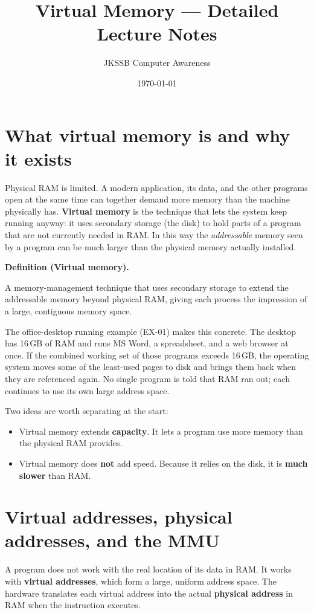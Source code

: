 \documentclass[11pt]{article}
\title{Virtual Memory --- Detailed Lecture Notes}
\author{JKSSB Computer Awareness}
\date{\today}
\newenvironment{definitionbox}[1]{%
  \par\noindent\textbf{Definition (#1).}\ \itshape
}{\par\vspace{0.3em}}
\begin{document}
\maketitle

\section{What virtual memory is and why it exists}
Physical RAM is limited. A modern application, its data, and the other
programs open at the same time can together demand more memory than the
machine physically has. \textbf{Virtual memory} is the technique that lets the
system keep running anyway: it uses secondary storage (the disk) to hold parts
of a program that are not currently needed in RAM. In this way the \emph{addressable}
memory seen by a program can be much larger than the physical memory actually
installed.

\begin{definitionbox}{Virtual memory}
A memory-management technique that uses secondary storage to extend the
addressable memory beyond physical RAM, giving each process the impression of a
large, contiguous memory space.
\end{definitionbox}

The office-desktop running example (EX-01) makes this concrete. The desktop has
16\,GB of RAM and runs MS Word, a spreadsheet, and a web browser at once. If the
combined working set of those programs exceeds 16\,GB, the operating system
moves some of the least-used pages to disk and brings them back when they are
referenced again. No single program is told that RAM ran out; each continues to
use its own large address space.

Two ideas are worth separating at the start:
\begin{itemize}
  \item Virtual memory extends \textbf{capacity}. It lets a program use more
    memory than the physical RAM provides.
  \item Virtual memory does \textbf{not} add speed. Because it relies on the
    disk, it is \textbf{much slower} than RAM.
\end{itemize}

\section{Virtual addresses, physical addresses, and the MMU}
A program does not work with the real location of its data in RAM. It works
with \textbf{virtual addresses}, which form a large, uniform address space.
The hardware translates each virtual address into the actual \textbf{physical
address} in RAM when the instruction executes.
\end{document}

